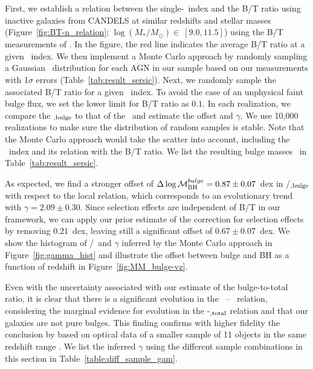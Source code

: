 \documentclass[apj]{emulateapj}
\begin{document}
First, we establish a relation between the single-\sersic\ index and the B/T ratio using inactive galaxies from CANDELS at similar redshifts and stellar masses (Figure~\ref{fig:BT-n_relation}; $\log (M_*/M_{\odot})\in~ [9.0, 11.5]$) using the B/T measurements of \citet{Dimauro2018}. In the figure, the red line indicates the average B/T ratio at a given \sersic\ index. We then implement a Monte Carlo approach by randomly sampling a Gaussian \sersic\ distribution for each AGN in our sample based on our measurements with 1$\sigma$ errors (Table~\ref{tab:result_sersic}). Next, we randomly sample the associated B/T ratio for a given \sersic\ index. To avoid the case of an unphysical faint bulge flux, we set the lower limit for B/T ratio as $0.1$. In each realization, we compare the \smass$_{\rm, bulge}$ to that of the \mbh\ and estimate the offset and $\gamma$.  We use 10,000 realizations to make sure the distribution of random samples is stable. Note that the Monte Carlo approach would take the scatter into account, including the \sersic\ index and its relation with the B/T ratio. We list the resulting bulge masses \bmass\ in Table~\ref{tab:result_sersic}.

As expected, we find a stronger offset of
$\Delta \log \mathcal M_{\rm BH}^{bulge} = 0.87\pm0.07$~dex in \mbh/\smass$_{\rm, bulge}$ with respect to the
local relation, which corresponds to an evolutionary trend with
$\gamma = 2.09\pm0.30$. Since selection effects are independent of B/T in
our framework, we can apply our prior estimate of the correction for selection effects by removing $0.21$~dex, leaving still a significant offset of $0.67\pm0.07$~dex. We show the histogram of  \mbh/\smass\ and $\gamma$ inferred by
the Monte Carlo approach in Figure~\ref{fig:gamma_hist} and illustrate the offset between bulge and BH
as a function of redshift in Figure~\ref{fig:MM_bulge-vz}.

Even with the uncertainty associated with our estimate of the
bulge-to-total ratio, it is clear that there is a significant evolution
in the \mbh\ -- \bmass\ relation, considering the
marginal evidence for evolution in the \mbh-\smass$_{\rm, total}$
relation and that our galaxies are not pure bulges. This finding
confirms with higher fidelity the conclusion by \citet{Bennert11}
based on optical data of a smaller sample of 11 objects in the same
redshift range \citep[see][for similar results]{SS13, Jah++09, Cisternas2011}. We list the inferred $\gamma$ using the different sample combinations in this section in
Table~\ref{table:diff_sample_gam}.
\end{document}

